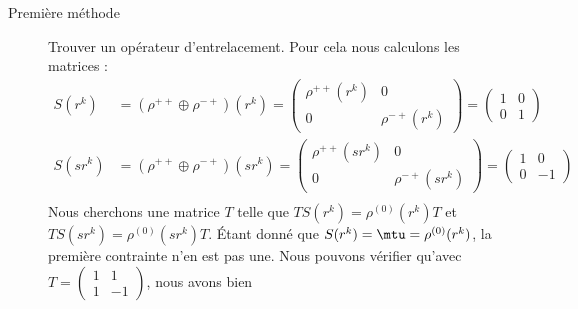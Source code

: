 \begin{enumerate}
\begin{description}
		      \item[Première méthode]
			      Trouver un opérateur d'entrelacement. Pour cela nous calculons les matrices :
			      \begin{subequations}
				      \begin{align}
					      S(r^k)  & =(\rho^{++}\oplus \rho^{-+})(r^k)=\begin{pmatrix}
						                                                  \rho^{++}(r^k) & 0              \\
						                                                  0              & \rho^{-+}(r^k)
					                                                  \end{pmatrix}=\begin{pmatrix}
						                                                                1 & 0 \\
						                                                                0 & 1
					                                                                \end{pmatrix}    \\
					      S(sr^k) & =(\rho^{++}\oplus \rho^{-+})(sr^k)=\begin{pmatrix}
						                                                   \rho^{++}(sr^k) & 0               \\
						                                                   0               & \rho^{-+}(sr^k)
					                                                   \end{pmatrix}=\begin{pmatrix}
						                                                                 1 & 0  \\
						                                                                 0 & -1
					                                                                 \end{pmatrix} \\
				      \end{align}
			      \end{subequations}
			      Nous cherchons une matrice \( T\) telle que \( TS(r^k)=\rho^{(0)}(r^k)T\) et \( TS(sr^k)=\rho^{(0)}(sr^k)T\). Étant donné que \( S(r^k)=\mtu=\rho^{(0)}(r^k)\), la première contrainte n'en est pas une. Nous pouvons vérifier qu'avec \( T=\begin{pmatrix}
				      1 & 1  \\
				      1 & -1
			      \end{pmatrix}\), nous avons bien

\end{description}
\end{enumerate}
